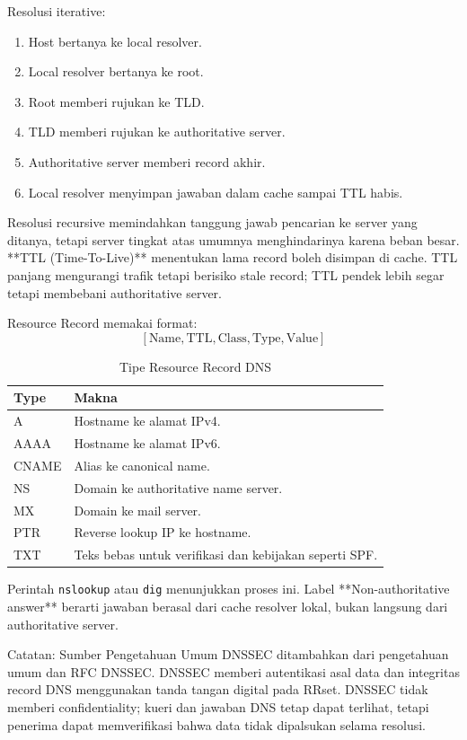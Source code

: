 Resolusi iterative:
\begin{enumerate}
    \item Host bertanya ke local resolver.
    \item Local resolver bertanya ke root.
    \item Root memberi rujukan ke TLD.
    \item TLD memberi rujukan ke authoritative server.
    \item Authoritative server memberi record akhir.
    \item Local resolver menyimpan jawaban dalam cache sampai TTL habis.
\end{enumerate}

Resolusi recursive memindahkan tanggung jawab pencarian ke server yang ditanya, tetapi server tingkat atas umumnya menghindarinya karena beban besar. **TTL (Time-To-Live)** menentukan lama record boleh disimpan di cache. TTL panjang mengurangi trafik tetapi berisiko stale record; TTL pendek lebih segar tetapi membebani authoritative server.

Resource Record memakai format:
\[
    [\text{Name}, \text{TTL}, \text{Class}, \text{Type}, \text{Value}]
\]

\begin{table}[H]
\centering
\begin{tabularx}{\textwidth}{|L{0.18\textwidth}|X|}
\hline
\textbf{Type} & \textbf{Makna} \\
\hline
A & Hostname ke alamat IPv4. \\
\hline
AAAA & Hostname ke alamat IPv6. \\
\hline
CNAME & Alias ke canonical name. \\
\hline
NS & Domain ke authoritative name server. \\
\hline
MX & Domain ke mail server. \\
\hline
PTR & Reverse lookup IP ke hostname. \\
\hline
TXT & Teks bebas untuk verifikasi dan kebijakan seperti SPF. \\
\hline
\end{tabularx}
\caption{Tipe Resource Record DNS}
\label{tab:dns-rr}
\end{table}

Perintah \texttt{nslookup} atau \texttt{dig} menunjukkan proses ini. Label **Non-authoritative answer** berarti jawaban berasal dari cache resolver lokal, bukan langsung dari authoritative server.

\begin{cmt}{Catatan: Sumber Pengetahuan Umum}{}
DNSSEC ditambahkan dari pengetahuan umum dan RFC DNSSEC. DNSSEC memberi autentikasi asal data dan integritas record DNS menggunakan tanda tangan digital pada RRset. DNSSEC tidak memberi confidentiality; kueri dan jawaban DNS tetap dapat terlihat, tetapi penerima dapat memverifikasi bahwa data tidak dipalsukan selama resolusi.
\end{cmt}

